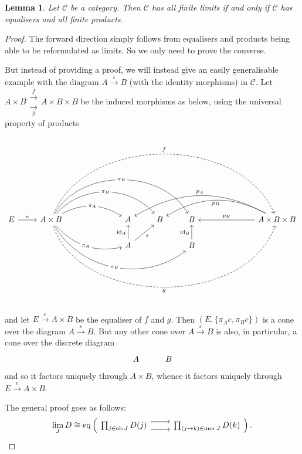 \documentclass[a4paper,11pt]{article}
\theoremstyle{break_italics}
\newtheorem*{lemma*}{Lemma}
\theoremstyle{break_upright}
\theoremstyle{remark}
\newcommand{\id}{\mathrm{id}}
\newcommand{\ob}{\operatorname{ob}}
\newcommand{\mor}{\operatorname{mor}}
\newcommand{\C}{\mathcal{C}}
\begin{document}
\begin{lemma*}
	Let $\C$ be a category. Then $\C$ has all finite limits if and only if $\C$ has equalisers and all finite products.
\end{lemma*}
\begin{proof}
	The forward direction simply follows from equalisers and products being able to be reformulated as limits. So we only need to prove the converse.

	But instead of providing a proof, we will instead give an easily generalisable example with the diagram $A \xrightarrow{\varepsilon} B$ (with the identity morphisms) in $\C$. Let $A \times B \substack{\xrightarrow{f} \\ \xrightarrow[g]{}} A \times B \times B$ be the induced morphisms as below, using the universal property of products
\[
\begin{tikzcd}
E \arrow[r, "e"] & A \times B \arrow[rrr, "\pi_A" description, bend left] \arrow[rrrr, "\pi_B" description, bend left=49] \arrow[rrrrr, "\pi_B" description, bend left=60] \arrow[rrrd, "\pi_A" description, bend right] \arrow[rrrrrrrr, "f", dashed, bend left=67] \arrow[rrrrrrrr, "g"', dashed, bend right=71] \arrow[rrrrrd, "\pi_B" description, bend right=49] &  &  & A                                               & B & B                    &  &  & A \times B \times B \arrow[lllll, "p_A"', bend right] \arrow[llll, "p_B", bend right] \arrow[lll, "p_B"'] \\
                 &                                                                                                                                                                                                                                                                                                                                                    &  &  & A \arrow[u, "\id_A"] \arrow[ru, "\varepsilon"'] &   & B \arrow[u, "\id_B"] &  &  &                                                                                                          
\end{tikzcd}
\]
and let $E \xrightarrow{e} A \times B$ be the equaliser of $f$ and $g$. Then $(E, \{\pi_A e, \pi_B e\})$ is a cone over the diagram $A \xrightarrow{\varepsilon} B$. But any other cone over $A \xrightarrow{\varepsilon} B$ is also, in particular, a cone over the discrete diagram 
\[
	\begin{tikzcd}
	A & B
\end{tikzcd}
\]
and so it factors uniquely through $A \times B$, whence it factors uniquely through $E \xrightarrow{e} A \times B$.

The general proof goes as follows:
\[
\lim_J D \cong \operatorname{eq}\Big( \begin{tikzcd}
\prod_{j\in \ob J} D(j) \arrow[r, shift left=2] \arrow[r, shift right=2] & \prod_{(j \rightarrow k) \in \mor J} D(k)
\end{tikzcd} \Big)\,. \qedhere
\]
\end{proof}
\end{document}
